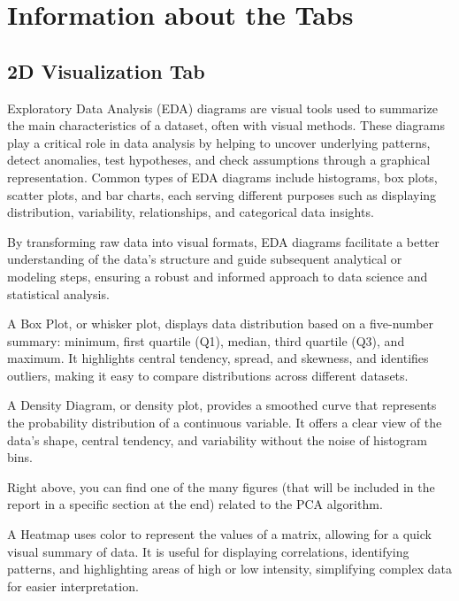 \documentclass[unnumsec,webpdf,contemporary,large]{oup-authoring-template}%
\theoremstyle{thmstyleone}%
\theoremstyle{thmstyletwo}%
\theoremstyle{thmstylethree}%
\begin{document}
\section{Information about the Tabs}\label{subsec1}
\vspace{0.3cm}

\subsection{\textbf{2D Visualization Tab}}
\vspace{0.2cm}

Exploratory Data Analysis (EDA) diagrams are visual tools used to summarize the main characteristics of a dataset, often with visual methods. These diagrams play a critical role in data analysis by helping to uncover underlying patterns, detect anomalies, test hypotheses, and check assumptions through a graphical representation. Common types of EDA diagrams include histograms, box plots, scatter plots, and bar charts, each serving different purposes such as displaying distribution, variability, relationships, and categorical data insights. 
\vspace{0.2cm}

By transforming raw data into visual formats, EDA diagrams facilitate a better understanding of the data's structure and guide subsequent analytical or modeling steps, ensuring a robust and informed approach to data science and statistical analysis.
\vspace{0.2cm}

A Box Plot, or whisker plot, displays data distribution based on a five-number summary: minimum, first quartile (Q1), median, third quartile (Q3), and maximum. It highlights central tendency, spread, and skewness, and identifies outliers, making it easy to compare distributions across different datasets.
\vspace{0.2cm}

A Density Diagram, or density plot, provides a smoothed curve that represents the probability distribution of a continuous variable. It offers a clear view of the data’s shape, central tendency, and variability without the noise of histogram bins.
\vspace{0.1cm}

Right above, you can find one of the many figures (that will be included in the report in a specific section at the end) related to the PCA algorithm.
\vspace{0.2cm}

A Heatmap uses color to represent the values of a matrix, allowing for a quick visual summary of data. It is useful for displaying correlations, identifying patterns, and highlighting areas of high or low intensity, simplifying complex data for easier interpretation.
\vspace{0.2cm}
\end{document}
